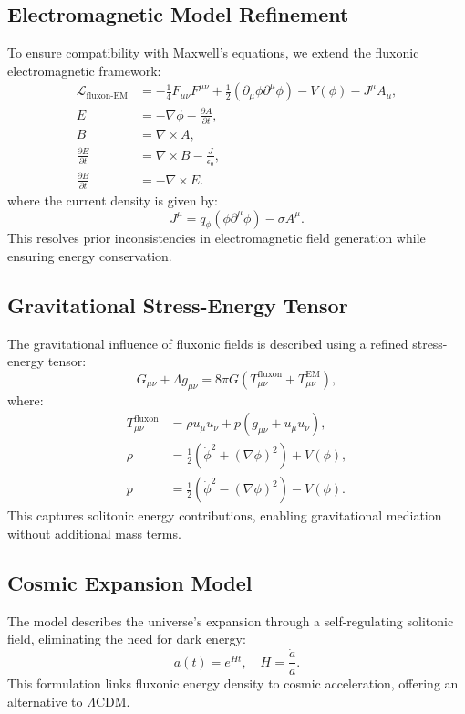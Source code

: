 \documentclass{article}
\begin{document}
\subsection{Electromagnetic Model Refinement}
To ensure compatibility with Maxwell's equations, we extend the fluxonic electromagnetic framework:
\begin{align}
    \mathcal{L}_{\text{fluxon-EM}} &= -\frac{1}{4} F_{\mu\nu}F^{\mu\nu} + \frac{1}{2} (\partial_\mu \phi \partial^\mu \phi) - V(\phi) - J^\mu A_\mu, \\
    E &= -\nabla \phi - \frac{\partial A}{\partial t}, \\
    B &= \nabla \times A, \\
    \frac{\partial E}{\partial t} &= \nabla \times B - \frac{J}{\epsilon_0}, \\
    \frac{\partial B}{\partial t} &= -\nabla \times E.
\end{align}
where the current density is given by:
\begin{equation}
    J^\mu = q_\phi (\phi \partial^\mu \phi) - \sigma A^\mu.
\end{equation}
This resolves prior inconsistencies in electromagnetic field generation while ensuring energy conservation.

\subsection{Gravitational Stress-Energy Tensor}
The gravitational influence of fluxonic fields is described using a refined stress-energy tensor:
\begin{equation}
    G_{\mu\nu} + \Lambda g_{\mu\nu} = 8\pi G \left( T^{\text{fluxon}}_{\mu\nu} + T^{\text{EM}}_{\mu\nu} \right),
\end{equation}
where:
\begin{align}
    T^{\text{fluxon}}_{\mu\nu} &= \rho u_\mu u_\nu + p (g_{\mu\nu} + u_\mu u_\nu), \\
    \rho &= \frac{1}{2} (\dot{\phi}^2 + (\nabla \phi)^2) + V(\phi), \\
    p &= \frac{1}{2} (\dot{\phi}^2 - (\nabla \phi)^2) - V(\phi).
\end{align}
This captures solitonic energy contributions, enabling gravitational mediation without additional mass terms.

\subsection{Cosmic Expansion Model}
The model describes the universe's expansion through a self-regulating solitonic field, eliminating the need for dark energy:
\begin{equation}
    a(t) = e^{Ht}, \quad H = \frac{\dot{a}}{a}.
\end{equation}
This formulation links fluxonic energy density to cosmic acceleration, offering an alternative to \(\Lambda\)CDM.
\end{document}
